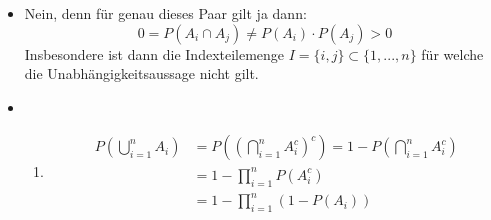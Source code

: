\documentclass[a4paper]{article}
\newenvironment{Aufgabe}[2][Aufgabe]{\begin{trivlist}
\item[\hskip \labelsep {\bfseries #1}\hskip \labelsep {\bfseries #2.}]}{\end{trivlist}}
\begin{document}
\maketitle
	\begin{Aufgabe}{3}
	\end{Aufgabe}

	\begin{itemize}
		\item[a)] Nein, denn für genau dieses Paar gilt ja dann:
			\[
				0 = P(A_i \cap A_j) \neq P(A_i) \cdot P(A_j) > 0
			\] 
			Insbesondere ist dann die Indexteilemenge $I = \{
				i, j
			\} \subset \{
				1, ..., n
			\} $ für welche die Unabhängigkeitsaussage nicht gilt.

		\item[b)] {
				\begin{enumerate}
					\item[(i)] {
							\begin{align*}
								P \left(
									\bigcup_{i=1}^n A_i
								\right) &= 
								P \left(
									\left(
										\bigcap_{i=1}^n A_i ^{c}
									\right) 
									^{c}
								\right) =
								1 - P \left(
									\bigcap_{i=1}^n A_i ^{c}
								\right) \\
								&= 1 - \prod_{i=1}^{n} P(A_i ^{c}) \\
								&= 1 - \prod_{i=1}^{n} \left(
									1 - P(A_i)
								\right)
							\end{align*}
						}
				\end{enumerate}
			}
	\end{itemize}
\end{document}
